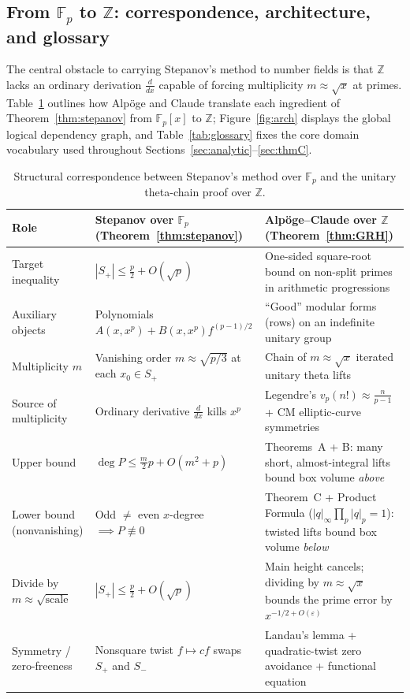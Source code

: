\documentclass[11pt]{amsart}
\newcommand{\ZZ}{\mathbb{Z}}
\newcommand{\FF}{\mathbb{F}}
\newcommand{\eps}{\varepsilon}
\theoremstyle{definition}
\theoremstyle{remark}
\begin{document}
\subsection{From \texorpdfstring{$\FF_p$}{F\_p} to \texorpdfstring{$\ZZ$}{Z}: correspondence, architecture, and glossary}
The central obstacle to carrying Stepanov's method to number fields is that $\ZZ$ lacks an ordinary derivation $\frac{d}{dx}$ capable of forcing multiplicity $m\approx\sqrt{x}$ at primes. Table~\ref{tab:dict} outlines how Alp\"oge and Claude translate each ingredient of Theorem~\ref{thm:stepanov} from $\FF_p[x]$ to $\ZZ$; Figure~\ref{fig:arch} displays the global logical dependency graph, and Table~\ref{tab:glossary} fixes the core domain vocabulary used throughout Sections~\ref{sec:analytic}--\ref{sec:thmC}.

\begin{table}[tbp]
\centering\footnotesize
\caption{Structural correspondence between Stepanov's method over $\FF_p$ and the unitary theta-chain proof over $\ZZ$.}\label{tab:dict}
\begin{tabular}{@{}>{\raggedright\arraybackslash}p{}>{\raggedright\arraybackslash}p{}>{\raggedright\arraybackslash}p{}@{}}
\toprule
Role & Stepanov over $\FF_p$ (Theorem~\ref{thm:stepanov}) & Alp\"oge--Claude over $\ZZ$ (Theorem~\ref{thm:GRH})\\
\midrule
Target inequality & $|S_+|\le \frac{p}{2}+O(\sqrt{p})$ & One-sided square-root bound on non-split primes in arithmetic progressions\\
\addlinespace[3pt]
Auxiliary objects & Polynomials $A(x,x^p)+B(x,x^p)f^{(p-1)/2}$ & ``Good'' modular forms (rows) on an indefinite unitary group\\
\addlinespace[3pt]
Multiplicity $m$ & Vanishing order $m\approx\sqrt{p/3}$ at each $x_0\in S_+$ & Chain of $m\approx\sqrt{x}$ iterated unitary theta lifts\\
\addlinespace[3pt]
Source of multiplicity & Ordinary derivative $\frac{d}{dx}$ kills $x^p$ & Legendre's $v_p(n!)\approx\frac{n}{p-1}$ + CM elliptic-curve symmetries\\
\addlinespace[3pt]
Upper bound & $\deg P\le \frac{m}{2}p+O(m^2+p)$ & Theorems~A + B: many short, almost-integral lifts bound box volume \emph{above}\\
\addlinespace[3pt]
Lower bound (nonvanishing) & Odd $\ne$ even $x$-degree $\implies P\not\equiv 0$ & Theorem~C + Product Formula ($|q|_\infty\prod_p|q|_p=1$): twisted lifts bound box volume \emph{below}\\
\addlinespace[3pt]
Divide by $m\approx\sqrt{\text{scale}}$ & $|S_+|\le \frac{p}{2}+O(\sqrt{p})$ & Main height cancels; dividing by $m\approx\sqrt{x}$ bounds the prime error by $x^{-1/2+O(\eps)}$\\
\addlinespace[3pt]
Symmetry / zero-freeness & Nonsquare twist $f\mapsto cf$ swaps $S_+$ and $S_-$ & Landau's lemma + quadratic-twist zero avoidance + functional equation\\
\bottomrule
\end{tabular}
\end{table}
\end{document}
